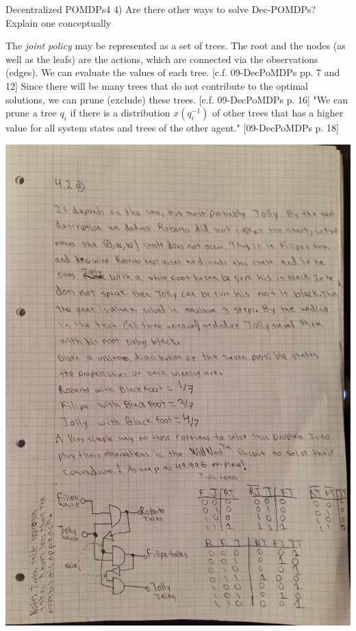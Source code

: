 \begin{questions}
\begin{question}{Decentralized POMDPs}{4}
	4) Are there other ways to solve Dec-POMDPs? Explain one conceptually
	\begin{answer}
		
		The \textit{joint policy} may be represented as a set of trees.
		The root and the nodes (as well as the leafs) are the actions, which are connected via the observations (edges).
		We can evaluate the values of each tree.
		[c.f. 09-DecPoMDPs pp. 7 and 12]
		Since there will be many trees that do not contribute to the optimal solutions, we can prune (exclude) these trees.
		[c.f. 09-DecPoMDPs p. 16]
		"We  can prune a tree $q_i$ if there is a distribution $x(q_i^{-1})$ of other trees that has a higher value for all system states and trees of the other agent."
		[09-DecPoMDPs p. 18]
	\end{answer}
	\newpage
	\includegraphics[scale=0.2]{p1.jpg}
	\newpage

\end{question}
\end{questions}
